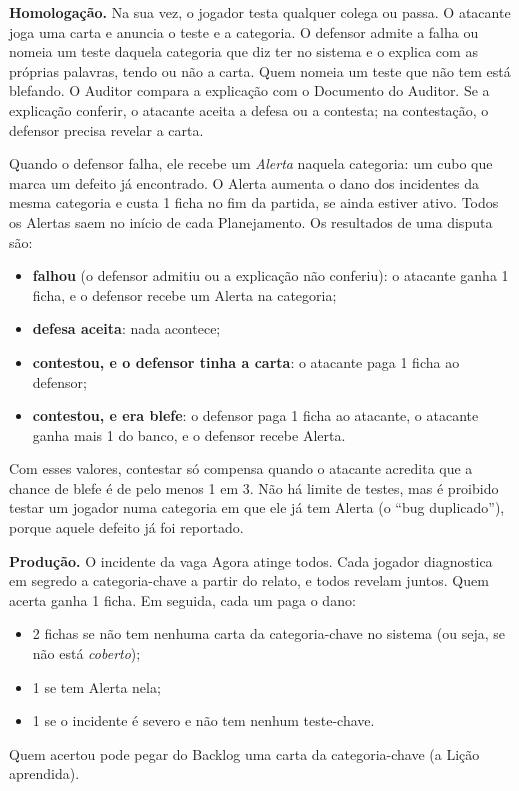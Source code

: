 \textbf{Homologação.} Na sua vez, o jogador testa qualquer colega ou passa. O atacante joga uma carta e anuncia o
teste e a categoria. O defensor admite a falha ou nomeia um teste daquela categoria que diz ter no sistema e o
explica com as próprias palavras, tendo ou não a carta. Quem nomeia um teste que não tem está blefando. O Auditor
compara a explicação com o Documento do Auditor. Se a explicação conferir, o atacante aceita a defesa ou a
contesta; na contestação, o defensor precisa revelar a carta.

Quando o defensor falha, ele recebe um \emph{Alerta} naquela categoria: um cubo que marca um defeito já
encontrado. O Alerta aumenta o dano dos incidentes da mesma categoria e custa 1 ficha no fim da partida, se ainda
estiver ativo. Todos os Alertas saem no início de cada Planejamento. Os resultados de uma disputa são:
\begin{itemize}
  \item \textbf{falhou} (o defensor admitiu ou a explicação não conferiu): o atacante ganha 1 ficha, e o defensor
    recebe um Alerta na categoria;
  \item \textbf{defesa aceita}: nada acontece;
  \item \textbf{contestou, e o defensor tinha a carta}: o atacante paga 1 ficha ao defensor;
  \item \textbf{contestou, e era blefe}: o defensor paga 1 ficha ao atacante, o atacante ganha mais 1 do banco, e o
    defensor recebe Alerta.
\end{itemize}
Com esses valores, contestar só compensa quando o atacante acredita que a chance de blefe é de pelo menos 1 em 3.
Não há limite de testes, mas é proibido testar um jogador numa categoria em que ele já tem Alerta (o ``bug
duplicado''), porque aquele defeito já foi reportado.

\textbf{Produção.} O incidente da vaga Agora atinge todos. Cada jogador diagnostica em segredo a categoria-chave a
partir do relato, e todos revelam juntos. Quem acerta ganha 1 ficha. Em seguida, cada um paga o dano:
\begin{itemize}
  \item 2 fichas se não tem nenhuma carta da categoria-chave no sistema (ou seja, se não está \emph{coberto});
  \item 1 se tem Alerta nela;
  \item 1 se o incidente é severo e não tem nenhum teste-chave.
\end{itemize}
Quem acertou pode pegar do Backlog uma carta da categoria-chave (a Lição aprendida).

